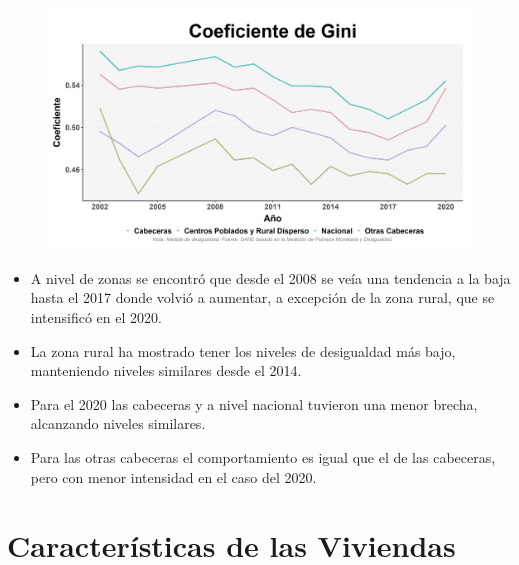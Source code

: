     \begin{figure}[H]
        \caption[Coeficiente de Gini por zonas y nacional ]{\label{gini_zonas} }
        \begin{center}
        \includegraphics[width=\textwidth,keepaspectratio]{img/var_256_trend.png}
        \end{center}
    \end{figure}
            \begin{itemize}
                    \item A nivel de zonas se encontró que desde el 2008 se veía una tendencia a la baja hasta el 2017 donde volvió a aumentar, a excepción de la zona rural, que se intensificó en el 2020.
                    \item La zona rural ha mostrado tener los niveles de desigualdad más bajo, manteniendo niveles similares desde el 2014.
                    \item Para el 2020 las cabeceras y a nivel nacional tuvieron una menor brecha, alcanzando niveles similares.
                    \item Para las otras cabeceras el comportamiento es igual que el de las cabeceras, pero con menor intensidad en el caso del 2020.
                    \end{itemize}

\section{Características de las Viviendas}

